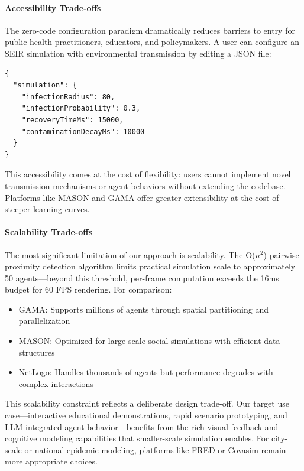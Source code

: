 \paragraph{Accessibility Trade-offs}
The zero-code configuration paradigm dramatically reduces barriers to entry for public health practitioners, educators, and policymakers. A user can configure an SEIR simulation with environmental transmission by editing a JSON file:
\begin{verbatim}
{
  "simulation": {
    "infectionRadius": 80,
    "infectionProbability": 0.3,
    "recoveryTimeMs": 15000,
    "contaminationDecayMs": 10000
  }
}
\end{verbatim}
This accessibility comes at the cost of flexibility: users cannot implement novel transmission mechanisms or agent behaviors without extending the codebase. Platforms like MASON and GAMA offer greater extensibility at the cost of steeper learning curves.

\paragraph{Scalability Trade-offs}
The most significant limitation of our approach is scalability. The O($n^2$) pairwise proximity detection algorithm limits practical simulation scale to approximately 50 agents---beyond this threshold, per-frame computation exceeds the 16ms budget for 60 FPS rendering. For comparison:
\begin{itemize}
    \item GAMA: Supports millions of agents through spatial partitioning and parallelization
    \item MASON: Optimized for large-scale social simulations with efficient data structures
    \item NetLogo: Handles thousands of agents but performance degrades with complex interactions
\end{itemize}

This scalability constraint reflects a deliberate design trade-off. Our target use case---interactive educational demonstrations, rapid scenario prototyping, and LLM-integrated agent behavior---benefits from the rich visual feedback and cognitive modeling capabilities that smaller-scale simulation enables. For city-scale or national epidemic modeling, platforms like FRED or Covasim \cite{kerr2021covasim} remain more appropriate choices.


